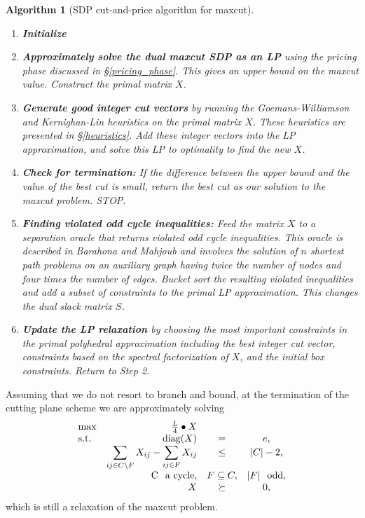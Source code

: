 \documentclass[12pt]{article}
\newtheorem{algorithm1}{Algorithm}
\newenvironment{algorithm}[1]{\begin{algorithm1}[#1]~\\
    \vspace{-0.5cm}}{\end{algorithm1}}
\begin{document}
\begin{algorithm}{SDP cut-and-price algorithm for maxcut}
\label{algo_cnp}
\begin{enumerate}
\item{\bf Initialize}

\item{\bf Approximately solve the dual
maxcut SDP as an LP} using the pricing phase discussed in
\S\ref{pricing_phase}. This gives an upper bound on the maxcut
value. Construct the primal matrix $X$.

\item{\bf Generate good integer cut vectors} by running the
Goemans-Williamson and Kernighan-Lin heuristics on the primal
matrix $X$. These heuristics are presented in \S\ref{heuristics}.
Add these integer vectors into the LP approximation, and solve
this LP to optimality to find the new $X$.

\item{\bf Check for termination:} If the difference
between the upper bound and the value of the best cut is small,
return the best cut as our solution to the maxcut problem. STOP.

\item{\bf Finding violated odd cycle inequalities:} Feed the
matrix $X$ to a separation oracle that returns violated odd cycle
inequalities. This oracle is described in Barahona and Mahjoub
\cite{barahona4} and involves the solution of $n$ shortest path
problems on an auxiliary graph having twice the number of nodes
and four times the number of edges. Bucket sort the resulting
violated inequalities and add a subset of constraints to the
primal LP approximation. This changes the dual slack matrix $S$.

\item{\bf Update the LP relaxation} by choosing the most important
constraints in the primal polyhedral approximation including the
best integer cut vector, constraints based on the spectral
factorization of $X$, and the initial box constraints. Return to
Step 2.
\end{enumerate}
\end{algorithm}
Assuming that we do not resort to branch and bound, at the
termination of the cutting plane scheme we are approximately
solving
\begin{eqnarray}
\label{maxcut_as_sdp_oc}
\begin{array}{lrcc}
\max & \frac{L}{4} \bullet X \\
\mbox{s.t.} & \mbox{diag}(X) & = & e, \\
& \displaystyle \sum_{ij \in C \backslash F} X_{ij} - \displaystyle \sum_{ij \in F} X_{ij} & \le & |C|-2, \\
& \mbox{C} \hspace*{0.25cm} \mbox{a cycle}, & F \subseteq C, & |F| \hspace*{0.25cm} \mbox{odd}, \\
& X & \succeq & 0,
\end{array}
\end{eqnarray}
which is still a relaxation of the maxcut problem.
\end{document}
